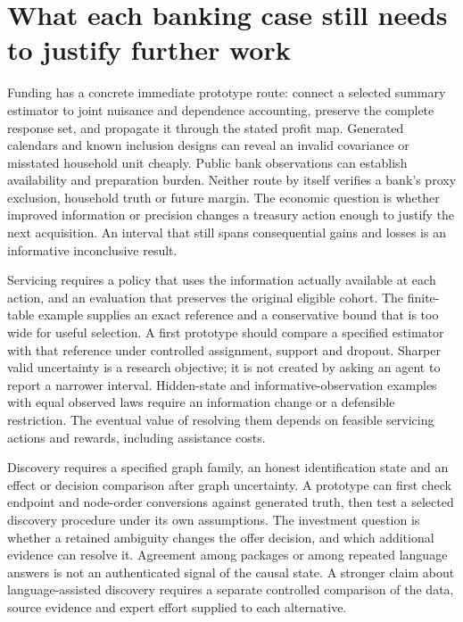 \section{What each banking case still needs to justify further work}
\label{exec14:l8-research}

Funding has a concrete immediate prototype route: connect a selected summary
estimator to joint nuisance and dependence accounting, preserve the complete
response set, and propagate it through the stated profit map. Generated
calendars and known inclusion designs can reveal an invalid covariance or
misstated household unit cheaply. Public bank observations can establish
availability and preparation burden. Neither route by itself verifies a bank's
proxy exclusion, household truth or future margin. The economic question is
whether improved information or precision changes a treasury action enough to
justify the next acquisition. An interval that still spans consequential gains
and losses is an informative inconclusive result.

Servicing requires a policy that uses the information actually available at
each action, and an evaluation that preserves the original eligible cohort.
The finite-table example supplies an exact reference and a conservative bound
that is too wide for useful selection. A first prototype should compare a
specified estimator with that reference under controlled assignment, support
and dropout. Sharper valid uncertainty is a research objective; it is not
created by asking an agent to report a narrower interval. Hidden-state and
informative-observation examples with equal observed laws require an information
change or a defensible restriction. The eventual value of resolving them depends
on feasible servicing actions and rewards, including assistance costs.

Discovery requires a specified graph family, an honest identification state and
an effect or decision comparison after graph uncertainty. A prototype can first
check endpoint and node-order conversions against generated truth, then test a
selected discovery procedure under its own assumptions. The investment question
is whether a retained ambiguity changes the offer decision, and which additional
evidence can resolve it. Agreement among packages or among repeated language
answers is not an authenticated signal of the causal state. A stronger claim
about language-assisted discovery requires a separate controlled comparison of
the data, source evidence and expert effort supplied to each alternative.

